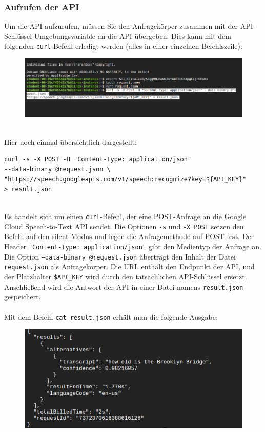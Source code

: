 \documentclass[12pt,a4paper]{article}
\begin{document}
\subsubsection{Aufrufen der API}
Um die API aufzurufen, müssen Sie den Anfragekörper zusammen mit der API-Schlüssel-Umgebungsvariable an die API übergeben. Dies kann mit dem folgenden \texttt{curl}-Befehl erledigt werden (alles in einer einzelnen Befehlszeile):

\begin{figure}[h!]
	\centering
	\includegraphics[width=1\linewidth]{../images/curl}
\end{figure}
\ \\
Hier noch einmal übersichtlich dargestellt:
\begin{verbatim}
curl -s -X POST -H "Content-Type: application/json" 
--data-binary @request.json \
"https://speech.googleapis.com/v1/speech:recognize?key=${API_KEY}" 
> result.json
\end{verbatim}
\ \\
Es handelt sich um einen \texttt{curl}-Befehl, der eine POST-Anfrage an die Google Cloud Speech-to-Text API sendet. Die Optionen \texttt{-s} und \texttt{-X POST} setzen den Befehl auf den silent-Modus und legen die Anfragemethode auf POST fest. Der Header \texttt{"Content-Type: application/json"} gibt den Medientyp der Anfrage an. Die Option \texttt{--data-binary @request.json} überträgt den Inhalt der Datei \texttt{request.json} als Anfragekörper. Die URL enthält den Endpunkt der API, und der Platzhalter \texttt{\${API\_KEY}} wird durch den tatsächlichen API-Schlüssel ersetzt. Anschließend wird die Antwort der API in einer Datei namens \texttt{result.json} gespeichert.
\\ \\
Mit dem Befehl \verb|cat result.json| erhält man die folgende Ausgabe: 
\begin{figure}[h!]
	\centering
	\includegraphics[width=1\linewidth]{../images/ergebnisse}
	\label{fig:ergebnisse}
\end{figure}
\end{document}
